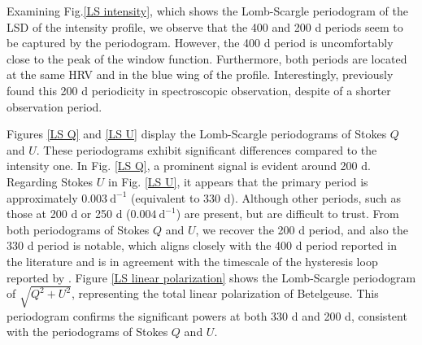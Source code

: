 \documentclass{aa}
\begin{document}
Examining Fig.\ref{LS intensity}, which shows the Lomb-Scargle periodogram of the LSD of the intensity profile, we observe that the 400 and 200 d periods seem to be captured by the periodogram. However, the 400 d period is uncomfortably close to the peak of the window function. Furthermore, both periods are located at the same HRV and in the blue wing of the profile. Interestingly, \cite{mathias_evolution_2018} previously found this 200 d periodicity in spectroscopic observation, despite of a shorter observation period. 



Figures \ref{LS Q} and \ref{LS U} display the Lomb-Scargle periodograms of Stokes $Q$ and $U$. These periodograms exhibit significant differences compared to the intensity one. In Fig. \ref{LS Q}, a prominent signal is evident around 200 d. Regarding Stokes $U$ in Fig. \ref{LS U}, it appears that the primary period is approximately $0.003 \ \mathrm{d^{-1}}$ (equivalent to 330 d). Although other periods, such as those at 200 d or 250 d ($0.004 \ \mathrm{d^{-1}}$) are present, but are difficult to trust. From both periodograms of Stokes $Q$ and $U$, we recover the 200 d period, and also the 330 d period is notable, which aligns closely with the 400 d period reported in the literature and is in agreement with the timescale of the hysteresis loop reported by \cite{kravchenko_tomography_2019}.  
Figure \ref{LS linear polarization} shows the Lomb-Scargle periodogram of $\sqrt{Q^2+U^2}$, representing the total linear polarization of Betelgeuse. 
This periodogram confirms the significant powers at both 330 d and 200 d, consistent with the periodograms of Stokes $Q$ and $U$. 

\end{document}
